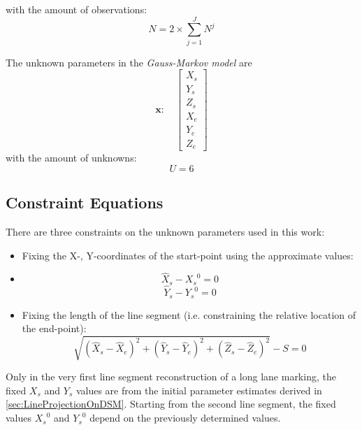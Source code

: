 with the amount of observations:
\begin{equation}
	N=2\times\displaystyle\sum_{j=1}^{J}N^j
\end{equation}

The unknown parameters in the \textit{Gauss-Markov model} are
\begin{equation}
	\boldsymbol x:\quad
	\begin{bmatrix}
		X_s\\
		Y_s\\
		Z_s\\
		X_e\\
		Y_e\\
		Z_e
	\end{bmatrix}
\end{equation}
with the amount of unknowns:
\begin{equation}
	U=6
\end{equation}

\clearpage

\subsection{Constraint Equations}
\label{subsec:ConEqua}

There are three constraints on the unknown parameters used in this work:
\begin{itemize}
\item Fixing the X-, Y-coordinates of the start-point using the approximate values:
\item [] \begin{equation} \label{eq:constraint1}
\hat{X}_s-{X_s}^0=0
\end{equation}
\begin{equation} \label{eq:constraint2}
\hat{Y}_s-{Y_s}^0=0
\end{equation}
\item Fixing the length of the line segment (i.e. constraining the relative location of the end-point):
\begin{equation} \label{eq:constraint3}
\sqrt{(\hat{X}_s-\hat{X}_e)^2+(\hat{Y}_s-\hat{Y}_e)^2+(\hat{Z}_s-\hat{Z}_e)^2}-S=0
\end{equation}
\end{itemize}

Only in the very first line segment reconstruction of a long lane marking, the fixed $X_s$ and $Y_s$ values are from the initial parameter estimates derived in \cref{sec:LineProjectionOnDSM}. Starting from the second line segment, the fixed values ${X_s}^0$ and ${Y_s}^0$ depend on the previously determined values.

